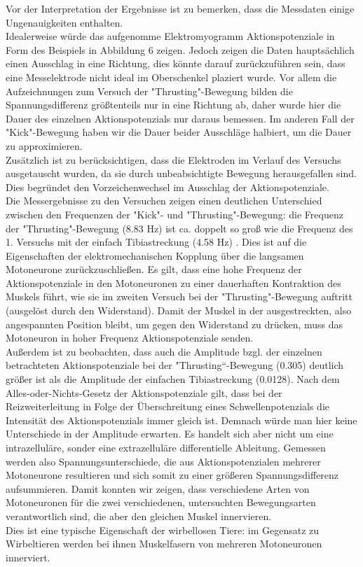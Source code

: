 Vor der Interpretation der Ergebnisse ist zu bemerken, dass die Messdaten einige Ungenauigkeiten enthalten. \\
Idealerweise würde das aufgenomme Elektromyogramm Aktionspotenziale in Form des Beispiels in Abbildung 6 zeigen. Jedoch zeigen die Daten hauptsächlich einen Ausschlag in eine Richtung, dies könnte darauf zurückzuführen sein, dass eine Messelektrode nicht ideal im Oberschenkel plaziert wurde. Vor allem die Aufzeichnungen zum Versuch der "{}Thrusting"{}-Bewegung bilden die Spannungsdifferenz größtenteils nur in eine Richtung ab, daher wurde hier die Dauer des einzelnen Aktionspotenzials nur daraus bemessen. Im anderen Fall der "{}Kick"{}-Bewegung haben wir die Dauer beider Ausschläge halbiert, um die Dauer zu approximieren. \\
Zusätzlich ist zu berücksichtigen, dass die Elektroden im Verlauf des Versuchs ausgetauscht wurden, da sie durch unbeabsichtigte Bewegung herausgefallen sind. Dies begründet den Vorzeichenwechsel im Ausschlag der Aktionspotenziale. \\

Die Messergebnisse zu den Versuchen zeigen einen deutlichen Unterschied zwischen den Frequenzen der "{}Kick"{}- und "{}Thrusting"{}-Bewegung: die Frequenz der "{}Thrusting"{}-Bewegung (8.83 Hz) ist ca. doppelt so groß wie die Frequenz des 1. Versuchs mit der einfach Tibiastreckung (4.58 Hz) . Dies ist auf die Eigenschaften der elektromechanischen Kopplung über die langsamen Motoneurone zurückzuschließen. Es gilt, dass eine hohe Frequenz der Aktionspotenziale in den Motoneuronen zu einer dauerhaften Kontraktion des Muskels führt, wie sie im zweiten Versuch bei der "{}Thrusting"{}-Bewegung auftritt (ausgelöst durch den Widerstand). Damit der Muskel in der ausgestreckten, also angespannten Position bleibt, um gegen den Widerstand zu drücken, muss das Motoneuron in hoher Frequenz Aktionspotenziale senden.  \\

Außerdem ist zu beobachten, dass auch die Amplitude bzgl. der einzelnen betrachteten Aktionspotenziale bei der "{}Thrusting“{}-Bewegung (0.305) deutlich größer ist als die Amplitude der einfachen Tibiastreckung (0.0128). Nach dem Alles-oder-Nichts-Gesetz der Aktionspotenziale gilt, dass bei der Reizweiterleitung in Folge der Überschreitung eines Schwellenpotenzials die Intensität des Aktionspotenzials immer gleich ist. Demnach würde man hier keine Unterschiede in der Amplitude erwarten. Es handelt sich aber nicht um eine intrazelluläre, sonder eine extrazelluläre differentielle Ableitung.  Gemessen werden also Spannungsunterschiede, die aus Aktionspotenzialen mehrerer Motoneurone resultieren und sich somit zu einer größeren Spannungsdifferenz aufsummieren. Damit konnten wir zeigen, dass verschiedene Arten von Motoneuronen für die zwei verschiedenen, untersuchten Bewegungsarten verantwortlich sind, die aber den gleichen Muskel innervieren. \\
Dies ist eine typische Eigenschaft der wirbellosen Tiere: im Gegensatz zu Wirbeltieren werden bei ihnen Muskelfasern von mehreren Motoneuronen innerviert. 



